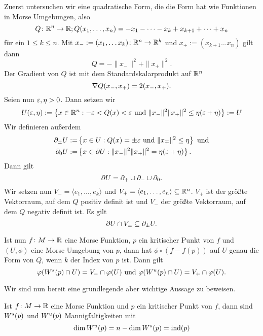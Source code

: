 \begin{definition}
    \label{def: notation morse umgebung}
    Zuerst untersuchen wir eine quadratische Form, die die Form hat wie Funktionen in Morse
    Umgebungen, also
    \[ Q \colon { \mathbb R }^n \to { \mathbb R } ; Q(x_1, \dots, x_n) = - x_1 - \dots - x_k + x_{k + 1} + \dots + x_n \]
    für ein $1 \leq k \leq n$.
    Mit $x_- := (x_1, \dots x_k) \colon { \mathbb R }^n \to { \mathbb R }^k$ und $x_+ := (x_{k + 1} \dots x_n)$ gilt dann
    \[ Q = - \| x_- \|^2 + \| x_+ \|^2 . \]
    Der Gradient von $Q$ ist mit dem Standardskalarprodukt auf ${ \mathbb R }^n$
    \[ { \nabla } Q (x_-, x_+) = 2(x_-, x_+) . \]
    Seien nun $\varepsilon, \eta > 0$. Dann setzen wir
    \[ U(\varepsilon, \eta) := \left\{ x \in { \mathbb R }^n : - \varepsilon < Q(x) < \varepsilon 
    \text{ und } \| x_- \|^2 \| x_+ \|^2 \leq \eta(\varepsilon + \eta) \right\} := U \]
    Wir definieren außerdem
    \begin{align*}
        { \partial }_{\pm} U := & \left\{ x \in U: Q(x) = \pm \varepsilon \text{ und } \|x_{\mp} \|^2 \leq \eta \right\} 
            \text{ und} \\
        { \partial }_0 U := & \left\{ x \in { \partial } U: \| x_- \|^2 \| x_+ \|^2 = \eta(\varepsilon + \eta) \right\} .
    \end{align*}
    Dann gilt 
    \[ { \partial } U = { \partial }_+ \cup { \partial }_- \cup { \partial }_0 . \]
    Wir setzen nun $V_- = \langle e_1, \dots, e_k \rangle$ und 
    $V_+ = \langle e_1, \dots, e_n \rangle \subseteq { \mathbb R }^n$. $V_+$ ist der größte Vektorraum, 
    auf dem $Q$ positiv definit ist und $V_-$ der größte Vektorraum, auf dem $Q$ negativ definit ist. 
    Es gilt 
    \[ { \partial } U \cap V_{\pm} \subseteq { \partial }_{\pm} U . \]

    Ist nun $f \colon M \to { \mathbb R }$ eine Morse Funktion, $p$ ein kritischer Punkt von $f$ und $(U, \phi)$
    eine Morse Umgebung von $p$, dann hat $\phi \circ (f - f(p))$ auf $U$ genau die Form von $Q$, wenn
    $k$ der Index von $p$ ist. Dann gilt 
    \[ 
        \varphi({ W^s }(p) \cap U) = V_- \cap \varphi(U) \text{ und } 
        \varphi({ W^u }(p) \cap U) = V_+ \cap \varphi(U) .
    \]
\end{definition}

Wir sind nun bereit eine grundlegende aber wichtige Aussage zu beweisen.

\begin{prop}
    Ist $f \colon M \to { \mathbb R }$ eine Morse Funktion und $p$ ein kritischer Punkt von $f$, dann sind
    ${ W^s } (p)$ und ${ W^u } (p)$ Mannigfaltigkeiten mit 
    \[ \dim { W^u } (p) = n - \dim { W^s } (p) = { \operatorname{ind} } (p) \]
\end{prop}

